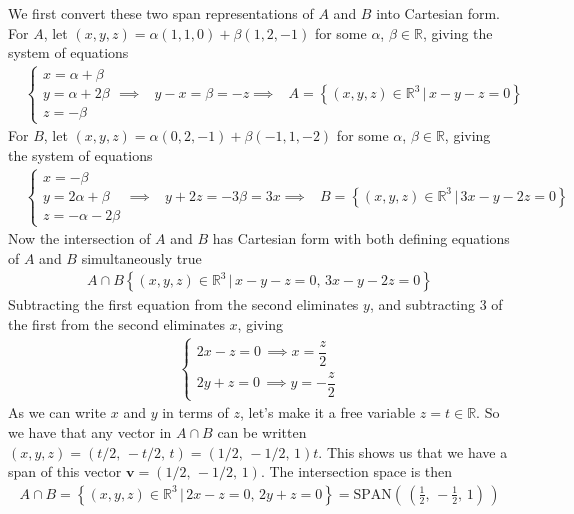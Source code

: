 {\noindent We first convert these two span representations of $A$ and $B$ into Cartesian form. For $A$, let $(x,y,z)=\alpha(1,1,0) + \beta(1,2,-1)$ for some $\alpha$, $\beta \in \mathbb{R}$, giving the system of equations
\begin{align*}
&\begin{cases}
x = \alpha + \beta \\
y = \alpha + 2\beta \\
z = -\beta
\end{cases}
\implies & y-x = \beta = -z
\implies & A = \left\{ (x,y,z)\in\mathbb{R}^3 \, | \, x - y - z = 0\right\}
\end{align*}
For $B$, let $(x,y,z)=\alpha(0,2,-1) + \beta(-1,1,-2)$ for some $\alpha$, $\beta \in \mathbb{R}$, giving the system of equations
\begin{align*}
&\begin{cases}
x = -\beta \\
y = 2\alpha + \beta \\
z = -\alpha - 2\beta
\end{cases}
\implies & y+2z = -3\beta = 3x
\implies & B = \left\{ (x,y,z)\in\mathbb{R}^3 \, | \, 3x - y - 2z = 0\right\}
\end{align*}
Now the intersection of $A$ and $B$ has Cartesian form with both defining equations of $A$ and $B$ simultaneously true
\begin{align*}
A \cap B \left\{ (x,y,z)\in\mathbb{R}^3 \, | \, x - y - z = 0, \, 3x - y - 2z = 0\right\}
\end{align*}
Subtracting the first equation from the second eliminates $y$, and subtracting 3 of the first from the second eliminates $x$, giving
\begin{align*}
\begin{cases}
2x - z = 0 \, \implies x = \dfrac{z}{2} \\
2y + z = 0 \, \implies y = -\dfrac{z}{2}
\end{cases}
\end{align*}
As we can write $x$ and $y$ in terms of $z$, let's make it a free variable $z=t\in\mathbb{R}$. So we have that any vector in $A\cap B$ can be written $(x,y,z)=(t/2,\,-t/2,\,t)=(1/2,\,-1/2,\,1)t$. This shows us that we have a span of this vector $\mathbf{v}=\left( 1/2,\,-1/2,\,1 \right)$. The intersection space is then
\begin{align*}
A \cap B = \left\{ \left( x,y,z \right) \in \mathbb{R}^3 \, | \, 2x-z = 0, \, 2y + z =0 \right\} = \text{SPAN}\left( \, \left( \frac{1}{2},\,-\frac{1}{2},\,1 \right) \, \right)

\end{align*}}
